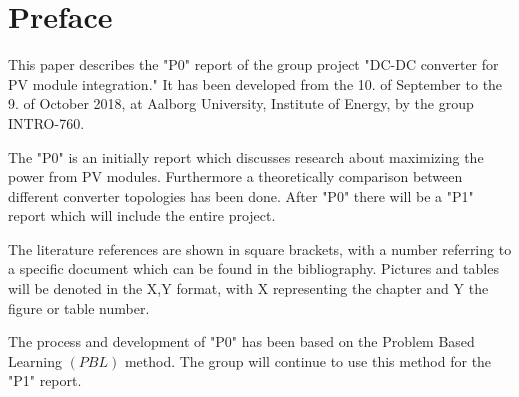 \chapter*{Preface}

This paper describes the "P0" report of the group project "DC-DC converter for PV module integration." It has been developed from the 10. of September to the 9. of October 2018, at Aalborg University, Institute of Energy, by the group INTRO-760.

The "P0" is an initially report which discusses research about maximizing the power from PV modules.
Furthermore a theoretically comparison between different converter topologies has been done. After "P0" there will be a "P1" report which will include the entire project.

The literature references are shown in square brackets, with a number referring to a specific document which can be found in the bibliography. Pictures and tables will be denoted in the X,Y format, with X representing the chapter and Y the figure or table number. 

The process and development of "P0" has been based on the Problem Based Learning $(PBL)$ method. The group will continue to use this method for the "P1" report.            
